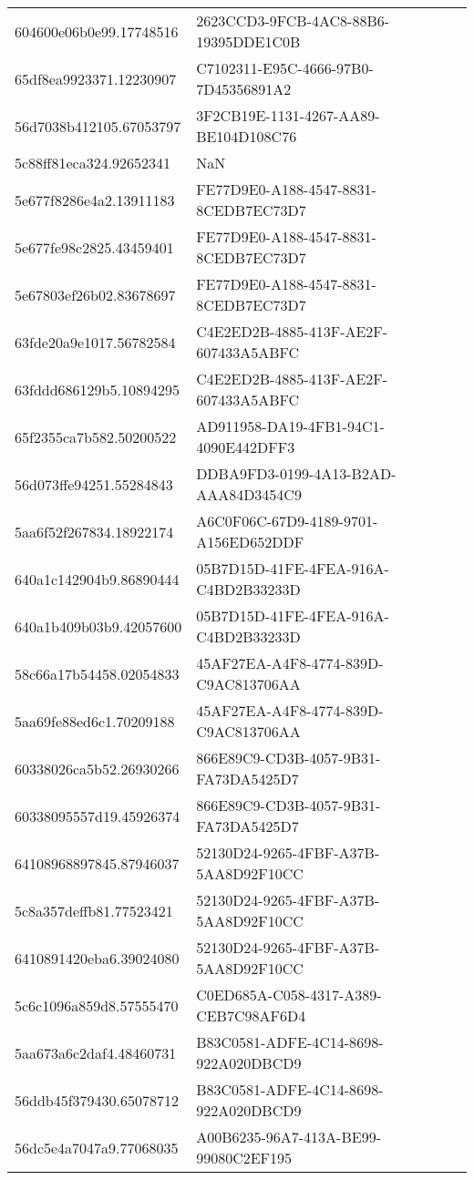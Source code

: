 \begin{tabular}{ll}
604600e06b0e99.17748516 & 2623CCD3-9FCB-4AC8-88B6-19395DDE1C0B \\
65df8ea9923371.12230907 & C7102311-E95C-4666-97B0-7D45356891A2 \\
56d7038b412105.67053797 & 3F2CB19E-1131-4267-AA89-BE104D108C76 \\
5c88ff81eca324.92652341 & NaN \\
5e677f8286e4a2.13911183 & FE77D9E0-A188-4547-8831-8CEDB7EC73D7 \\
5e677fe98c2825.43459401 & FE77D9E0-A188-4547-8831-8CEDB7EC73D7 \\
5e67803ef26b02.83678697 & FE77D9E0-A188-4547-8831-8CEDB7EC73D7 \\
63fde20a9e1017.56782584 & C4E2ED2B-4885-413F-AE2F-607433A5ABFC \\
63fddd686129b5.10894295 & C4E2ED2B-4885-413F-AE2F-607433A5ABFC \\
65f2355ca7b582.50200522 & AD911958-DA19-4FB1-94C1-4090E442DFF3 \\
56d073ffe94251.55284843 & DDBA9FD3-0199-4A13-B2AD-AAA84D3454C9 \\
5aa6f52f267834.18922174 & A6C0F06C-67D9-4189-9701-A156ED652DDF \\
640a1c142904b9.86890444 & 05B7D15D-41FE-4FEA-916A-C4BD2B33233D \\
640a1b409b03b9.42057600 & 05B7D15D-41FE-4FEA-916A-C4BD2B33233D \\
58c66a17b54458.02054833 & 45AF27EA-A4F8-4774-839D-C9AC813706AA \\
5aa69fe88ed6c1.70209188 & 45AF27EA-A4F8-4774-839D-C9AC813706AA \\
60338026ca5b52.26930266 & 866E89C9-CD3B-4057-9B31-FA73DA5425D7 \\
60338095557d19.45926374 & 866E89C9-CD3B-4057-9B31-FA73DA5425D7 \\
64108968897845.87946037 & 52130D24-9265-4FBF-A37B-5AA8D92F10CC \\
5c8a357deffb81.77523421 & 52130D24-9265-4FBF-A37B-5AA8D92F10CC \\
6410891420eba6.39024080 & 52130D24-9265-4FBF-A37B-5AA8D92F10CC \\
5c6c1096a859d8.57555470 & C0ED685A-C058-4317-A389-CEB7C98AF6D4 \\
5aa673a6c2daf4.48460731 & B83C0581-ADFE-4C14-8698-922A020DBCD9 \\
56ddb45f379430.65078712 & B83C0581-ADFE-4C14-8698-922A020DBCD9 \\
56dc5e4a7047a9.77068035 & A00B6235-96A7-413A-BE99-99080C2EF195 \\

\end{tabular}
